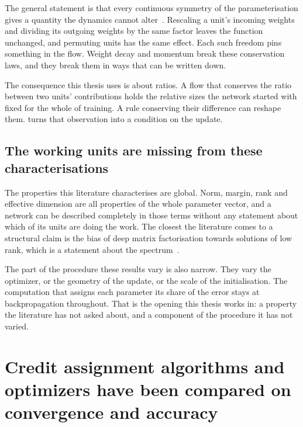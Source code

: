 The general statement is that every continuous symmetry of the
parameterisation gives a quantity the dynamics cannot
alter~\cite{kunin_neural_2021}. Rescaling a unit's incoming weights and
dividing its outgoing weights by the same factor leaves the function
unchanged, and permuting units has the same effect. Each such freedom pins
something in the flow. Weight decay and momentum break these conservation laws, and they
break them in ways that can be written down.

The consequence this thesis uses is about ratios. A flow that conserves the
ratio between two units' contributions holds the relative sizes the network
started with fixed for the whole of training. A rule conserving their
difference can reshape them.  turns that observation into a
condition on the update.

\subsection{The working units are missing from these characterisations}
\label{sec:bg_biasgap}

The properties this literature characterises are global. Norm, margin, rank
and effective dimension are all properties of the whole parameter vector, and
a network can be described completely in those terms without any statement
about which of its units are doing the work. The closest the literature comes
to a structural claim is the bias of deep matrix factorisation towards
solutions of low rank, which is a statement about the
spectrum~\cite{arora_implicit_2019, gunasekar_characterizing_2018}.

The part of the procedure these results vary is also narrow. They vary the
optimizer, or the geometry of the update, or the scale of the initialisation.
The computation that assigns each parameter its share of the error stays at
backpropagation throughout. That is the opening this thesis works in: a
property the literature has not asked about, and a component of the procedure
it has not varied.


\section{Credit assignment algorithms and optimizers have been compared on convergence and accuracy}
\label{sec:bg_rules}

